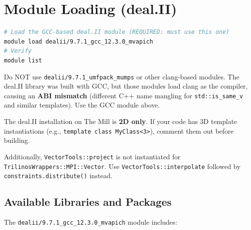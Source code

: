\documentclass[11pt,a4paper]{article}
\begin{document}
\section{Module Loading (deal.II)}
\begin{lstlisting}[language=bash]
# Load the GCC-based deal.II module (REQUIRED: must use this one)
module load dealii/9.7.1_gcc_12.3.0_mvapich
# Verify
module list
\end{lstlisting}
\begin{warningbox}
Do NOT use \texttt{dealii/9.7.1\_umfpack\_mumps} or other clang-based modules.
The deal.II library was built with GCC, but those modules load clang as the
compiler, causing an \textbf{ABI mismatch} (different C++ name mangling for
\texttt{std::is\_same\_v} and similar templates). Use the GCC module above.
\end{warningbox}
\begin{notebox}
The deal.II installation on The Mill is \textbf{2D only}. If your code has
3D template instantiations (e.g., \texttt{template class MyClass<3>}),
comment them out before building.

Additionally, \texttt{VectorTools::project} is not instantiated for
\texttt{TrilinosWrappers::MPI::Vector}. Use
\texttt{VectorTools::interpolate} followed by
\texttt{constraints.distribute()} instead.
\end{notebox}

\subsection{Available Libraries and Packages}
The \texttt{dealii/9.7.1\_gcc\_12.3.0\_mvapich} module includes:
\end{document}
